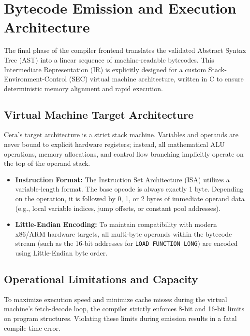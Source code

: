 \documentclass[11pt, a4paper]{article}
\begin{document}
\section{Bytecode Emission and Execution Architecture}
\noindent
The final phase of the compiler frontend translates the validated Abstract Syntax Tree (AST) into a linear sequence of machine-readable bytecodes. This Intermediate Representation (IR) is explicitly designed for a custom Stack-Environment-Control (SEC) virtual machine architecture, written in C to ensure deterministic memory alignment and rapid execution.

\subsection{Virtual Machine Target Architecture}
\noindent
Cera's target architecture is a strict stack machine. Variables and operands are never bound to explicit hardware registers; instead, all mathematical ALU operations, memory allocations, and control flow branching implicitly operate on the top of the operand stack. 

\begin{itemize}
    \item \textbf{Instruction Format:} The Instruction Set Architecture (ISA) utilizes a variable-length format. The base opcode is always exactly 1 byte. Depending on the operation, it is followed by 0, 1, or 2 bytes of immediate operand data (e.g., local variable indices, jump offsets, or constant pool addresses).
    \item \textbf{Little-Endian Encoding:} To maintain compatibility with modern x86/ARM hardware targets, all multi-byte operands within the bytecode stream (such as the 16-bit addresses for \texttt{LOAD\_FUNCTION\_LONG}) are encoded using Little-Endian byte order.
\end{itemize}

\subsection{Operational Limitations and Capacity}
\noindent
To maximize execution speed and minimize cache misses during the virtual machine's fetch-decode loop, the compiler strictly enforces 8-bit and 16-bit limits on program structures. Violating these limits during emission results in a fatal compile-time error.
\end{document}
